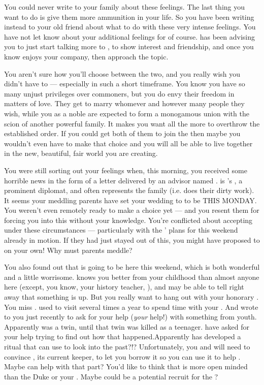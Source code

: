 \documentclass[char]{GL2020}
\begin{document}
You could never write to your family about these feelings.  The last thing you want to do is give them more ammunition in your life.  So you have been writing instead to your old friend \cWildCard{} about what to do with these very intense feelings.  You have not let \cWildCard{} know about your additional feelings for \cPresident{} of course.  \cWildCard{} has been advising you to just start talking more to \cHeir{}, to show interest and friendship, and once you know \cHeir{} enjoys your company, then approach the topic.  

You aren't sure how you'll choose between the two, and you really wish you didn't have to — especially in such a short timeframe. You know you have so many unjust privileges over commoners, but you do envy their freedom in matters of love. They get to marry whomever and however many people they wish, while you as a noble are expected to form a monogamous union with the scion of another powerful family. It makes you want all the more to overthrow the established order. If you could get both of them to join the \pGoaties{} then maybe you wouldn’t even have to make that choice and you will all be able to live together in the new, beautiful, fair world you are creating.
 
You were still sorting out your feelings when, this morning, you received some horrible news in the form of a letter delivered by an advisor named \cDiplomat{\full}. \cDiplomat{} is \cHeir{}’s \cDiplomat{\auncle}, a prominent diplomat, and often represents the family (i.e. does their dirty work). It seems your meddling parents have set your wedding to \cHeir{} to be THIS MONDAY. You weren't even remotely ready to make a choice yet — and you resent them for forcing you into this without your knowledge. You're conflicted about accepting under these circumstances — particularly with the \pGoaties{}’ plans for this weekend already in motion. If they had just stayed out of this, you might have proposed to \cHeir{} on your own!  Why must parents meddle?

You also found out that \cWildCard{} is going to be here this weekend, which is both wonderful and a little worrisome. \cWildCard{} knows you better from your childhood than almost anyone here (except, you know, your history teacher, \cHistory{}), and may be able to tell right away that something is up. But you really want to hang out with your honorary \cWildCard{\auncle}. You miss \cWildCard{\them}. \cWildCard{\They} used to visit several times a year to spend time with your \cWildCardFriend{\parent}. And \cWildCard{\they} wrote to you just recently to ask for your help (\emph{your} help!) with something from \cWildCard{\their} youth. Apparently \cWildCard{} was a twin, until that twin was killed as a teenager. \cWildCard{\They} have asked for your help trying to find out how that happened.Apparently \cWildCard{} has developed a ritual that can use \iMirror{} to look into the past?!? Unfortunately, you and \cWildCard{} will need to convince \cDiplomat{}, its current keeper,  to let you borrow it so you can use it to help \cWildCard{}. Maybe \cHeir{} can help with that part? You’d like to think that \cWildCard{} is more open minded than the Duke or your \cWildCardFriend{\parent}. Maybe \cWildCard{} could be a potential recruit for the \pGoaties{}?  
\end{document}
